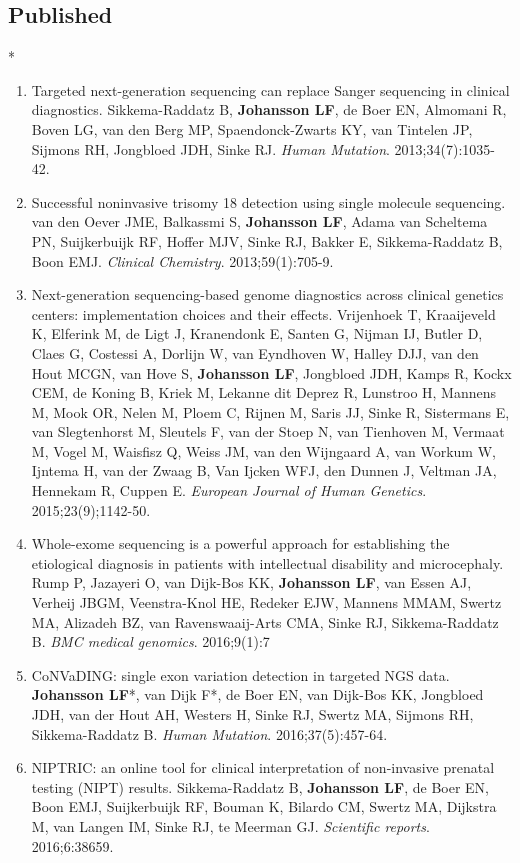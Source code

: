 \begin{appendices}
	\section{Published}*
	\begin{enumerate}
		\item Targeted next-generation sequencing can replace Sanger sequencing in clinical diagnostics. Sikkema-Raddatz B, \textbf{Johansson LF}, de Boer EN, Almomani R, Boven LG, van den Berg MP, Spaendonck-Zwarts KY, van Tintelen JP, Sijmons RH, Jongbloed JDH, Sinke RJ. \textsl{Human Mutation}. 2013;34(7):1035-42.
	\item Successful noninvasive trisomy 18 detection using single molecule sequencing. van den Oever JME, Balkassmi S, \textbf{Johansson LF}, Adama van Scheltema PN, Suijkerbuijk RF, Hoffer MJV, Sinke RJ, Bakker E, Sikkema-Raddatz B,  Boon EMJ. \textsl{Clinical Chemistry}. 2013;59(1):705-9.
	\item Next-generation sequencing-based genome diagnostics across clinical genetics centers: implementation choices and their effects. Vrijenhoek T, Kraaijeveld K, Elferink M, de Ligt J,  Kranendonk E, Santen G, Nijman IJ, Butler D, Claes G, Costessi A, Dorlijn W, van Eyndhoven W, Halley DJJ, van den Hout MCGN, van Hove S, \textbf{Johansson LF}, Jongbloed JDH, Kamps R, Kockx CEM, de Koning B, Kriek M, Lekanne dit Deprez R, Lunstroo H, Mannens M, Mook OR, Nelen M, Ploem C, Rijnen M, Saris JJ, Sinke R, Sistermans E, van Slegtenhorst M, Sleutels F, van der Stoep N, van Tienhoven M, Vermaat M, Vogel M, Waisfisz Q, Weiss JM, van den Wijngaard A, van Workum W, Ijntema H, van der Zwaag B, Van Ijcken WFJ, den Dunnen J, Veltman JA, Hennekam R, Cuppen E. \textsl{European Journal of Human Genetics}. 2015;23(9);1142-50.
	\item Whole-exome sequencing is a powerful approach for establishing the etiological diagnosis in patients with intellectual disability and microcephaly. Rump P, Jazayeri O, van Dijk-Bos KK, \textbf{Johansson LF}, van Essen AJ, Verheij JBGM, Veenstra-Knol HE, Redeker EJW, Mannens MMAM, Swertz MA, Alizadeh BZ, van Ravenswaaij-Arts CMA, Sinke RJ, Sikkema-Raddatz B. \textsl{BMC medical genomics}. 2016;9(1):7
	\item CoNVaDING: single exon variation detection in targeted NGS data. \textbf{Johansson LF}*, van Dijk F*, de Boer EN, van Dijk-Bos KK, Jongbloed JDH, van der Hout AH, Westers H, Sinke RJ, Swertz MA, Sijmons RH, Sikkema-Raddatz B. \textsl{Human Mutation}. 2016;37(5):457-64.
	\item NIPTRIC: an online tool for clinical interpretation of non-invasive prenatal testing (NIPT) results. Sikkema-Raddatz B, \textbf{Johansson LF}, de Boer EN, Boon EMJ, Suijkerbuijk RF, Bouman K, Bilardo CM, Swertz MA, Dijkstra M, van Langen IM, Sinke RJ, te Meerman GJ. \textsl{Scientific reports}. 2016;6:38659.

\end{enumerate}
\end{appendices}
